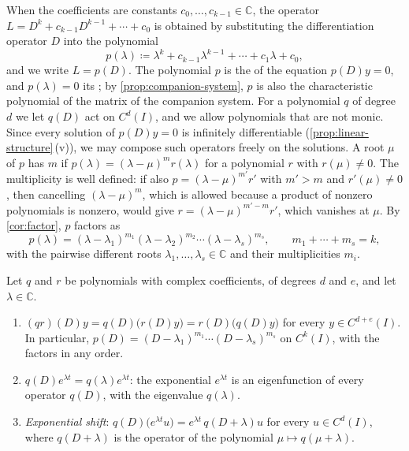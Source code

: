When the coefficients are constants $c_0,\ldots,c_{k-1}\in\mathbb C$, the operator $L=D^k+c_{k-1}D^{k-1}+\cdots+c_0$ is obtained by substituting the differentiation operator $D$ into the polynomial
\[
p(\lambda)\coloneqq\lambda^k+c_{k-1}\lambda^{k-1}+\cdots+c_1\lambda+c_0 ,
\]
and we write $L=p(D)$. The polynomial $p$ is the  of the equation $p(D)y=0$, and $p(\lambda)=0$ its ; by \cref{prop:companion-system}, $p$ is also the characteristic polynomial of the matrix of the companion system. For a polynomial $q$ of degree $d$ we let $q(D)$ act on $C^d(I)$, and we allow polynomials that are not monic. Since every solution of $p(D)y=0$ is infinitely differentiable (\cref{prop:linear-structure}\,(v)), we may compose such operators freely on the solutions. A root $\mu$ of $p$ has  $m$ if $p(\lambda)=(\lambda-\mu)^mr(\lambda)$ for a polynomial $r$ with $r(\mu)\ne0$. The multiplicity is well defined: if also $p=(\lambda-\mu)^{m'}r'$ with $m'>m$ and $r'(\mu)\ne0$, then cancelling $(\lambda-\mu)^m$, which is allowed because a product of nonzero polynomials is nonzero, would give $r=(\lambda-\mu)^{m'-m}r'$, which vanishes at $\mu$. By \cref{cor:factor}, $p$ factors as
\begin{equation}
p(\lambda)=(\lambda-\lambda_1)^{m_1}(\lambda-\lambda_2)^{m_2}\cdots(\lambda-\lambda_s)^{m_s},\qquad m_1+\cdots+m_s=k,
\label{eq:char-factorisation}
\end{equation}
with the pairwise different roots $\lambda_1,\ldots,\lambda_s\in\mathbb C$ and their multiplicities $m_i$.

\begin{lemma}[Polynomials in $D$]
\label{lem:polynomials-in-d}
Let $q$ and $r$ be polynomials with complex coefficients, of degrees $d$ and $e$, and let $\lambda\in\mathbb C$.
\begin{enumerate}
\item $(qr)(D)y=q(D)\bigl(r(D)y\bigr)=r(D)\bigl(q(D)y\bigr)$ for every $y\in C^{d+e}(I)$. In particular, $p(D)=(D-\lambda_1)^{m_1}\cdots(D-\lambda_s)^{m_s}$ on $C^k(I)$, with the factors in any order.
\item $q(D)e^{\lambda t}=q(\lambda)e^{\lambda t}$: the exponential $e^{\lambda t}$ is an eigenfunction of every operator $q(D)$, with the eigenvalue $q(\lambda)$.
\item \emph{Exponential shift}: $q(D)\bigl(e^{\lambda t}u\bigr)=e^{\lambda t}\,q(D+\lambda)u$ for every $u\in C^d(I)$, where $q(D+\lambda)$ is the operator of the polynomial $\mu\mapsto q(\mu+\lambda)$.
\end{enumerate}
\end{lemma}

